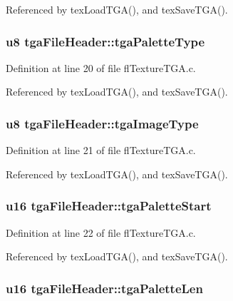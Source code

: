 Referenced by tex\-Load\-TGA(), and tex\-Save\-TGA().
\subsubsection{\setlength{\rightskip}{0pt plus 5cm}u8 {\bf tga\-File\-Header::tga\-Palette\-Type}}\label{structtgaFileHeader_764ca3189dc8a838f533e1091d16daf2}




Definition at line 20 of file fl\-Texture\-TGA.c.

Referenced by tex\-Load\-TGA(), and tex\-Save\-TGA().
\subsubsection{\setlength{\rightskip}{0pt plus 5cm}u8 {\bf tga\-File\-Header::tga\-Image\-Type}}\label{structtgaFileHeader_12c0b442f3d1f16119966da3a3f7616c}




Definition at line 21 of file fl\-Texture\-TGA.c.

Referenced by tex\-Load\-TGA(), and tex\-Save\-TGA().
\subsubsection{\setlength{\rightskip}{0pt plus 5cm}u16 {\bf tga\-File\-Header::tga\-Palette\-Start}}\label{structtgaFileHeader_f00a1f654455ec78a0c4f2f44b9e75c8}




Definition at line 22 of file fl\-Texture\-TGA.c.

Referenced by tex\-Load\-TGA(), and tex\-Save\-TGA().
\subsubsection{\setlength{\rightskip}{0pt plus 5cm}u16 {\bf tga\-File\-Header::tga\-Palette\-Len}}\label{structtgaFileHeader_40e9d201014f9ec3f4e2d32740635043}




